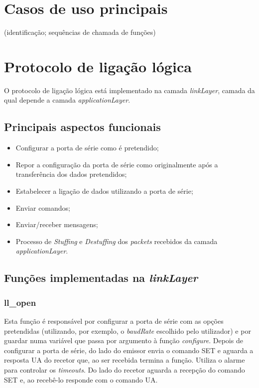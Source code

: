 \documentclass[11pt]{article}
\begin{document}
\newpage
\section{Casos de uso principais}

 (identificação; sequências de chamada de funções)


\newpage
\section{Protocolo de ligação lógica}

O protocolo de ligação lógica está implementado na camada \textit{linkLayer}, camada da qual depende a camada \textit{applicationLayer}.

\subsection{Principais aspectos funcionais}
\begin{itemize}
  \item Configurar a porta de série como é pretendido;
  \item Repor a configuração da porta de série como originalmente após a transferência dos dados pretendidos;
  \item  Estabelecer a ligação de dados utilizando a porta de série;
  \item  Enviar comandos;
  \item  Enviar/receber mensagens;
  \item Processo de \textit{Stuffing} e \textit{Destuffing} dos \textit{packets} recebidos da camada \textit{applicationLayer}.
\end{itemize}


\subsection{Funções implementadas na \textit{linkLayer}}
  
 \subsubsection{ll\_open}

	Esta função é responsável por configurar a porta de série com as opções pretendidas (utilizando, por exemplo, o \textit{baudRate} escolhido pelo utilizador) e por guardar numa variável que passa por argumento à função \textit{configure}.
	Depois de configurar a porta de série, do lado do emissor envia o comando SET e aguarda a resposta UA do recetor que, ao ser recebida termina a função. Utiliza o alarme para controlar os \textit{timeouts}. Do lado do recetor aguarda a recepção do comando SET e, ao recebê-lo responde com o comando UA.
   	
\end{document}
